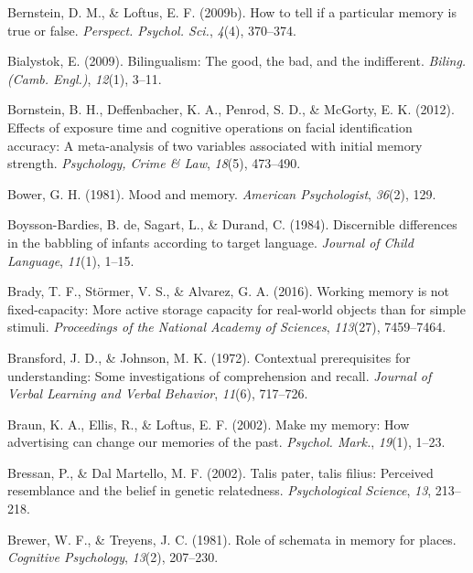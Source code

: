 \documentclass[
]{krantz}
\newlength{\cslhangindent}
\newenvironment{CSLReferences}[2] %
 {\begin{list}{}{%
  \setlength{\itemindent}{0pt}
  \setlength{\leftmargin}{0pt}
  \setlength{\parsep}{0pt}
  \ifodd #1
   \setlength{\leftmargin}{\cslhangindent}
   \setlength{\itemindent}{-1\cslhangindent}
  \fi
  \setlength{\itemsep}{#2\baselineskip}}}
 {\end{list}}
\begin{document}
\begin{CSLReferences}{1}{0}
Bernstein, D. M., \& Loftus, E. F. (2009b). How to tell if a particular memory is true or false. \emph{Perspect. Psychol. Sci.}, \emph{4}(4), 370--374.

Bialystok, E. (2009). Bilingualism: The good, the bad, and the indifferent. \emph{Biling. (Camb. Engl.)}, \emph{12}(1), 3--11.

Bornstein, B. H., Deffenbacher, K. A., Penrod, S. D., \& McGorty, E. K. (2012). Effects of exposure time and cognitive operations on facial identification accuracy: A meta-analysis of two variables associated with initial memory strength. \emph{Psychology, Crime \& Law}, \emph{18}(5), 473--490.

Bower, G. H. (1981). Mood and memory. \emph{American Psychologist}, \emph{36}(2), 129.

Boysson-Bardies, B. de, Sagart, L., \& Durand, C. (1984). Discernible differences in the babbling of infants according to target language. \emph{Journal of Child Language}, \emph{11}(1), 1--15.

Brady, T. F., Störmer, V. S., \& Alvarez, G. A. (2016). Working memory is not fixed-capacity: More active storage capacity for real-world objects than for simple stimuli. \emph{Proceedings of the National Academy of Sciences}, \emph{113}(27), 7459--7464.

Bransford, J. D., \& Johnson, M. K. (1972). Contextual prerequisites for understanding: Some investigations of comprehension and recall. \emph{Journal of Verbal Learning and Verbal Behavior}, \emph{11}(6), 717--726.

Braun, K. A., Ellis, R., \& Loftus, E. F. (2002). Make my memory: How advertising can change our memories of the past. \emph{Psychol. Mark.}, \emph{19}(1), 1--23.

Bressan, P., \& Dal Martello, M. F. (2002). Talis pater, talis filius: Perceived resemblance and the belief in genetic relatedness. \emph{Psychological Science}, \emph{13}, 213--218.

Brewer, W. F., \& Treyens, J. C. (1981). Role of schemata in memory for places. \emph{Cognitive Psychology}, \emph{13}(2), 207--230.


\end{CSLReferences}
\end{document}
